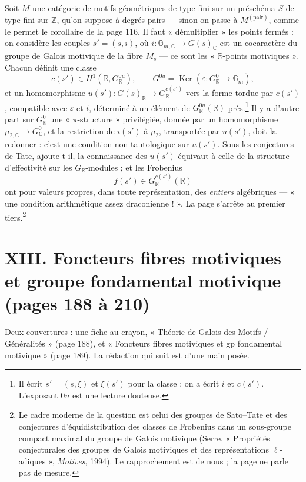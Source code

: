 \documentclass[11pt,a4paper]{article}
\begin{document}
Soit $M$ une catégorie de motifs géométriques de type fini sur un préschéma $S$ de
type fini sur $\mathbb{Z}$, qu'on suppose à degrés pairs --- sinon on passe à
$M^{(\mathrm{pair})}$, comme le permet le corollaire de la page 116. Il faut
« démultiplier » les points fermés : on considère les couples $s' = (s, i)$, où
$i \colon \mathbb{G}_{m,\mathbb{C}} \to G(s)_{\mathbb{C}}$ est un cocaractère du
groupe de Galois motivique de la fibre $M_{s}$ --- ce sont les
« $\mathbb{R}$-points motiviques ». Chacun définit une classe
\[
  c(s') \in H^{1}(\mathbb{R}, G^{0u}_{\mathbb{R}}), \qquad G^{0u} =
  \operatorname{Ker}(\varepsilon \colon G^{0}_{\mathbb{R}} \to \mathbb{G}_{m}) ,
\]
et un homomorphisme $u(s') \colon G(s)_{\mathbb{R}} \to G_{\mathbb{R}}^{c(s')}$
vers la forme tordue par $c(s')$, compatible avec $\varepsilon$ et $i$, déterminé
à un élément de $G^{0u}_{\mathbb{R}}(\mathbb{R})$ près.\footnote{Il écrit
$s' = (s, \xi)$ et $\xi(s')$ pour la classe ; on a écrit $i$ et $c(s')$.
L'exposant $0u$ est une lecture douteuse.} Il y a d'autre part sur
$G^{0}_{\mathbb{R}}$ une « $\pi$-structure » privilégiée, donnée par un
homomorphisme $\mu_{2,\mathbb{C}} \to G^{0}_{\mathbb{C}}$, et la restriction de
$i(s')$ à $\mu_{2}$, transportée par $u(s')$, doit la redonner : c'est une
condition non tautologique sur $u(s')$. Sous les conjectures de Tate, ajoute-t-il,
la connaissance des $u(s')$ équivaut à celle de la structure d'effectivité sur
les $G_{\mathbb{R}}$-modules ; et les Frobenius
\[
  f(s') \in G_{\mathbb{R}}^{c(s')}(\mathbb{R})
\]
ont pour valeurs propres, dans toute représentation, des \emph{entiers}
algébriques --- « une condition arithmétique assez draconienne ! ». La page
s'arrête au premier tiers.\footnote{Le cadre moderne de la question est celui
des groupes de Sato--Tate et des conjectures d'équidistribution des classes de
Frobenius dans un sous-groupe compact maximal du groupe de Galois motivique
(Serre, « Propriétés conjecturales des groupes de Galois motiviques et des
représentations $\ell$-adiques », \emph{Motives}, 1994). Le rapprochement est de
nous ; la page ne parle pas de mesure.}

\section*{XIII. Foncteurs fibres motiviques et groupe fondamental motivique (pages 188 à 210)}

Deux couvertures : une fiche au crayon, « Théorie de Galois des Motifs /
Généralités » (page 188), et « Foncteurs fibres motiviques et gp fondamental
motivique » (page 189). La rédaction qui suit est d'une main posée.
\end{document}
